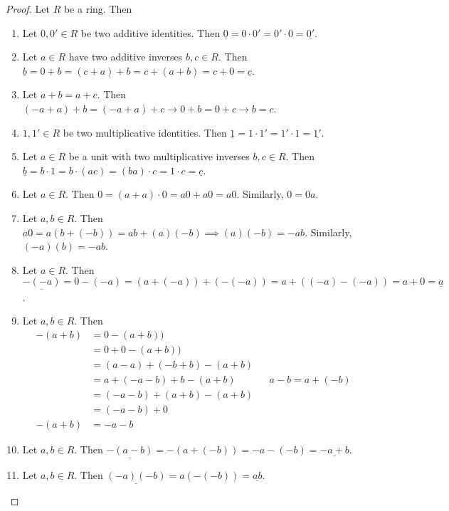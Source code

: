 \documentclass [12pt] {article}
\newcommand{\ul}[1]{\underline{{#1}}}
\begin{document}
\begin{proof}
    Let $R$ be a ring. Then
    \begin{enumerate}[label=(\arabic*)]
        \item Let $0, 0' \in R$ be two additive identities. Then
            $\ul{0} = 0 \cdot 0' = 0' \cdot 0 = \ul{0'}$.
        \item Let $a \in R$ have two additive inverses $b, c \in R$. Then
            \newline
            $\ul{b} = 0 + b = (c + a) + b = c + (a + b) = c + 0 = \ul{c}$.
        \item Let $a + b = a + c$. Then $(-a + a) + b = (-a + a) + c \to 0 + b = 0 + c \to b = c$.
        \item $1, 1' \in R$ be two multiplicative identities. Then
            $\ul{1} = 1 \cdot 1' = 1' \cdot 1 = \ul{1'}$.
        \item Let $a \in R$ be a unit with two multiplicative inverses $b, c \in R$. Then
            \newline
            $\ul{b} = b \cdot 1 = b \cdot (ac) = (ba) \cdot c = 1 \cdot c = \ul{c}$.
        \item Let $a \in R$. Then $0 = (a + a) \cdot 0 = a0 + a0 = a0$. Similarly, $0 = 0a$.
        \item Let $a, b \in R$. Then $a0 = a(b + (-b)) = ab + (a)(-b) \implies (a)(-b) = -ab$.
            Similarly, $(-a)(b) = -ab$.
        \item Let $a \in R$. Then
            \newline
            $\ul{-(-a)} = 0 - (-a) = (a + (-a)) + (-(-a)) = a + ((-a) - (-a)) = a + 0 = \ul{a}$.
        \item Let $a, b \in R$. Then
            \begin{align*}
                -(a + b) &= 0 - (a + b)) \\
                         &= 0 + 0 - (a + b)) \\
                         &= (a - a) + (-b + b) - (a + b) \\
                         &= a + (-a - b) + b - (a + b) && a - b = a + (-b) \\
                         &= (-a - b) + (a + b) - (a + b) \\
                         &= (-a - b) + 0 \\
                -(a + b) &= -a - b
            \end{align*}
        \item Let $a, b \in R$. Then $\ul{-(a - b)} = -(a + (-b)) = -a - (-b) = \ul{-a + b}$.
        \item Let $a, b \in R$. Then $\ul{(-a)(-b)} = a(-(-b)) = \ul{ab}$.
    \end{enumerate}
\end{proof}
\end{document}
